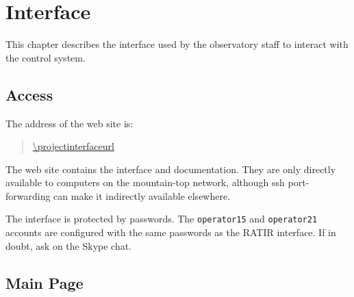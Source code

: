 \chapter{Interface}
\label{chapter:interface}

This chapter describes the interface used by the observatory staff to interact with the {\projectname} control system.

\section{Access}

The address of the {\projectname} web site is:
\begin{quotation}
\url{\projectinterfaceurl}
\end{quotation}

The web site contains the interface and documentation. They are only directly available to computers on the mountain-top network, although ssh port-forwarding can make it indirectly available elsewhere.

The interface is protected by passwords. The \verb|operator15| and \verb|operator21| accounts are configured with the same passwords as the RATIR interface. If in doubt, ask on the Skype chat.



\section{Main Page}

